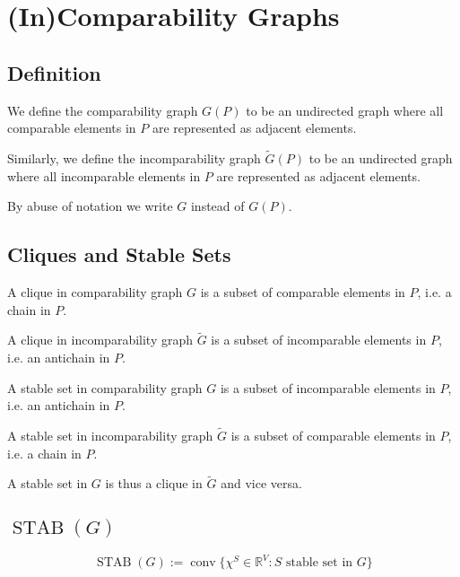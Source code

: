 \section{(In)Comparability Graphs}

\subsection{Definition}

We define the comparability graph ${G}(P)$ to be an undirected graph where all comparable elements in $P$ are represented as adjacent elements.

Similarly, we define the incomparability graph $\widetilde{G}(P)$ to be an undirected graph where all incomparable elements in $P$ are represented as adjacent elements.

By abuse of notation we write ${G}$ instead of ${G}(P)$.


\subsection{Cliques and Stable Sets}


A clique in comparability graph ${G}$ is a subset of comparable  elements in ${P}$, i.e. a chain in ${P}$.

A clique in incomparability graph $\widetilde{G}$ is a subset of incomparable  elements in ${P}$, i.e. an antichain in ${P}$.


A stable set in comparability graph ${G}$ is a subset of incomparable elements in ${P}$, i.e. an antichain in ${P}$.

A stable set in incomparability graph $\widetilde{G}$ is a subset of comparable elements in ${P}$, i.e. a chain in ${P}$.


A stable set in ${G}$ is thus a clique in $\widetilde{G}$ and vice versa.


\subsection{$\operatorname{STAB}(G)$}
\begin{equation}
\operatorname{STAB}(G) := \operatorname{conv}\{\chi^S \in \mathbb{R}^V : S\text{ stable set in }G\}
\label{eq:stab}
\end{equation}

